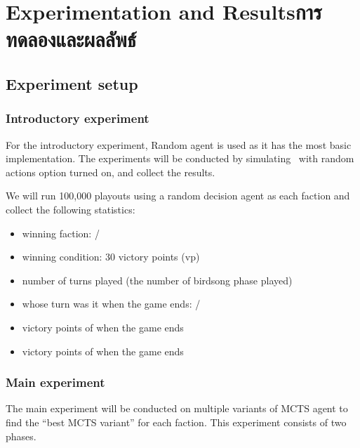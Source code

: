 \chapter{
    \ifenglish Experimentation and Results\else การทดลองและผลลัพธ์\fi
}



\section{Experiment setup}

\subsection{Introductory experiment}
For the introductory experiment, Random agent is used as it has the most basic implementation. The experiments will be conducted by simulating \RootOurs \ with random actions option turned on, and collect the results. 

We will run 100,000 \glspl{playout} using a random decision agent as each faction and collect the following statistics:
\begin{itemize}
    \item winning faction: \Marquise{} / \Eyrie
    \item winning condition: 30 victory points (vp)
    \item number of turns played (the number of birdsong phase played)
    \item whose turn was it when the game ends: \Marquise{} / \Eyrie
    \item victory points of \Marquise{} when the game ends
    \item victory points of \Eyrie{} when the game ends
\end{itemize}

\subsection{Main experiment}
The main experiment will be conducted on multiple variants of MCTS agent to find the ``best MCTS variant'' for each faction. This experiment consists of two phases. 

